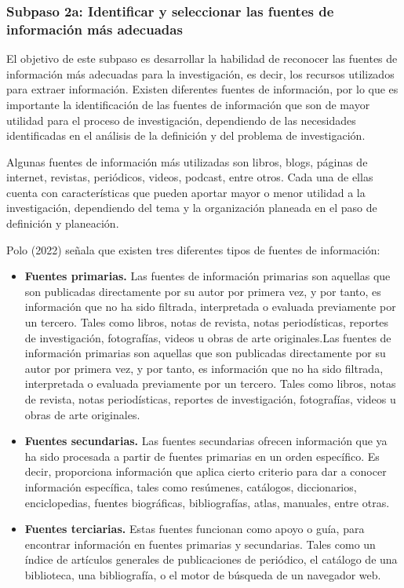 
\subsubsection{Subpaso 2a: Identificar y seleccionar las fuentes de información más adecuadas}
\label{secPaso2aCap2}

El objetivo de este subpaso es desarrollar la habilidad de reconocer las fuentes de información más adecuadas para la investigación, es decir, los recursos utilizados para extraer información. Existen diferentes fuentes de información, por lo que es importante la identificación de las fuentes de información que son de mayor utilidad para el proceso de investigación, dependiendo de las necesidades identificadas en el análisis de la definición y del problema de investigación.

Algunas fuentes de información más utilizadas son libros, blogs, páginas de internet, revistas, periódicos, videos, podcast, entre otros. Cada una de ellas cuenta con características que pueden aportar mayor o menor utilidad a la investigación, dependiendo del tema y la organización planeada en el paso de definición y planeación.

Polo (2022) señala que existen tres diferentes tipos de fuentes de información:

\begin{itemize}
  \item \textbf{Fuentes primarias.} Las fuentes de información primarias son aquellas que son publicadas directamente por su autor por primera vez, y por tanto, es información que no ha sido filtrada, interpretada o evaluada previamente por un tercero. Tales como libros, notas de revista, notas periodísticas, reportes de investigación, fotografías, videos u obras de arte originales.Las fuentes de información primarias son aquellas que son publicadas directamente por su autor por primera vez, y por tanto, es información que no ha sido filtrada, interpretada o evaluada previamente por un tercero. Tales como libros, notas de revista, notas periodísticas, reportes de investigación, fotografías, videos u obras de arte originales.
  \item \textbf{Fuentes secundarias.} Las fuentes secundarias ofrecen información que ya ha sido procesada a partir de fuentes primarias en un orden específico. Es decir, proporciona información que aplica cierto criterio para dar a conocer información específica, tales como resúmenes, catálogos, diccionarios, enciclopedias, fuentes biográficas, bibliografías, atlas, manuales, entre otras.
  \item \textbf{Fuentes terciarias.} Estas fuentes funcionan como apoyo o guía, para encontrar información en fuentes primarias y secundarias. Tales como un índice de artículos generales de publicaciones de periódico, el catálogo de una biblioteca, una bibliografía, o el motor de búsqueda de un navegador web.
\end{itemize}

